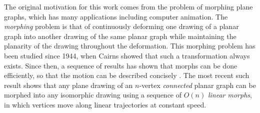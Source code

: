 \documentclass[11pt]{patmorin}
\begin{document}
The original motivation for this work comes from the
problem of morphing plane graphs, which has many applications
\cite{erten.kobourov.ea:intersection-free,friedrich.eades:graph,gotsman.surazhsky:guaranteed,surazhsky.gotsman:controllable,surazhsky.gotsman:intrinsic}
including computer animation.  
%
%
The 
\emph{morphing} problem is that of continuously deforming one drawing of
a planar graph into another drawing of the same planar graph
while maintaining the planarity of the drawing throughout the
deformation. This morphing problem has been studied since 1944,
when Cairns \cite{cairns:deformations} showed that such a transformation
always exists.  Since then, a sequence of results has shown that morphs
can be done efficiently, so that the motion can be described concisely
\cite{alamdari.angelini.ea:morphing,angelini.dalozzo.ea:morphing,grunbaum.shephard:geometry,thomassen:deformations}.
The most recent such result \cite{angelini.dalozzo.ea:morphing} shows
that any plane drawing of an $n$-vertex \emph{connected} planar graph
can be morphed into any isomorphic drawing using a sequence of $O(n)$
\emph{linear morphs}, in which vertices move along linear trajectories
at constant speed.
\end{document}
